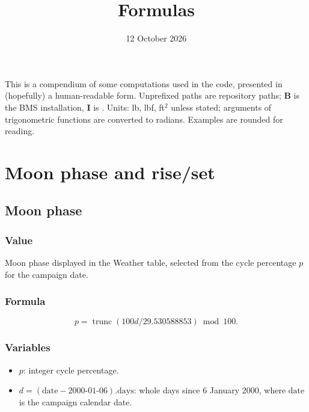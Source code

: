 \documentclass[10pt,a4paper]{amsart}
\title{Formulas}
\date{12 October 2026}
\DeclareMathOperator{\trunc}{trunc}
\begin{document}
\maketitle

This is a compendium of some computations used in the code, presented in (hopefully) a  human-readable form. Unprefixed paths are repository paths; \textbf{B} is the BMS installation,
\textbf{I} is . Units: lb, lbf, ft$^2$ unless stated;
arguments of trigonometric functions are converted to radians. Examples are rounded for reading.

\tableofcontents

\section{Moon phase and rise/set}\label{sec:moon}
\subsection{Moon phase}\label{subsec:moon-phase}
\subsubsection*{Value}
Moon phase displayed in the Weather table, selected from the
cycle percentage $p$ for the campaign date.

\subsubsection*{Formula}

\[
 p=\trunc(100d/29.530588853)\bmod100.
\]

\subsubsection*{Variables}

\begin{itemize}
\setlength{\itemsep}{0pt}
\setlength{\parsep}{0pt}
\item $p$: integer cycle percentage.
\item $d=(\text{date}-2000\text{-}01\text{-}06).\text{days}$: whole days since
6 January 2000, where $\text{date}$ is the campaign calendar date.
\end{itemize}
\end{document}
